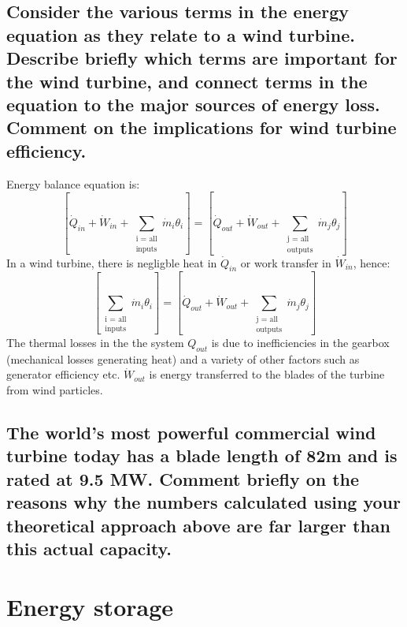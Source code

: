 \documentclass[12pt]{article}
\numberwithin{equation}{section}
\begin{document}
\begin{flushleft}
\subsection{Consider the various terms in the energy equation as they relate to a wind turbine. Describe briefly which terms are important for the wind turbine, and connect terms in the equation to the major sources of energy loss. Comment on the implications for wind turbine efficiency.}
Energy balance equation is:
\begin{equation}
  \left[ \dot{Q}_{in} + \dot{W}_{in} + \sum_{\substack{\text{i = all} \\ \text{inputs}}} \dot{m}_i \theta_i \right] = \left[ \dot{Q}_{out} + \dot{W}_{out} + \sum_{\substack{\text{j = all} \\ \text{outputs}}} \dot{m}_j \theta_j \right]
\end{equation}
In a wind turbine, there is negligble heat in $\dot{Q}_{in}$ or work transfer in $\dot{W}_{in}$, hence:
\begin{equation}
  \left[\sum_{\substack{\text{i = all} \\ \text{inputs}}} \dot{m}_i \theta_i \right] = \left[ \dot{Q}_{out} + \dot{W}_{out} + \sum_{\substack{\text{j = all} \\ \text{outputs}}} \dot{m}_j \theta_j \right]
\end{equation}
The thermal losses in the the system $\si{Q}_{out}$ is due to inefficiencies in the gearbox (mechanical losses generating heat) and a variety of other factors such as generator efficiency etc. $\dot{W}_{out}$ is energy transferred to the blades of the turbine from wind particles. 
\subsection{The world’s most powerful commercial wind turbine today has a blade length of 82m and is rated at 9.5 MW. Comment briefly on the reasons why the numbers calculated using your theoretical approach above are far larger than this actual capacity.}

\section{Energy storage}

\end{flushleft}
\end{document}
